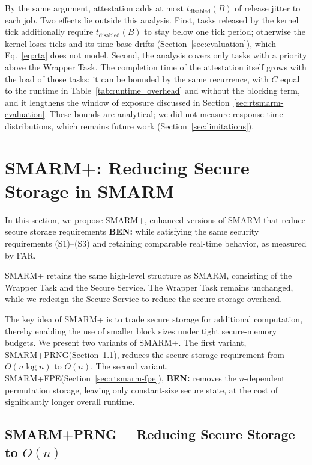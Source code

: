 \documentclass{ieeeaccess}
\DeclareRobustCommand{\ben}[1]{{\color{BENcolor}\textbf{BEN:} #1}}
\newcommand{\rtsmarm}{SMARM+\xspace}
\newcommand{\rtsmarmone}{SMARM+PRNG\xspace}
\newcommand{\rtsmarmtwo}{SMARM+FPE\xspace}
\begin{document}
{By the same argument, attestation adds at most $t_{\text{disabled}}(B)$ of release jitter to each job.
Two effects lie outside this analysis.
First, tasks released by the kernel tick additionally require $t_{\text{disabled}}(B)$ to stay below one tick period; otherwise the kernel loses ticks and its time base drifts (Section~\ref{sec:evaluation}), which Eq.~\eqref{eq:rta} does not model.
Second, the analysis covers only tasks with a priority above the Wrapper Task.
The completion time of the attestation itself grows with the load of those tasks; it can be bounded by the same recurrence, with $C$ equal to the runtime in Table~\ref{tab:runtime_overhead} and without the blocking term, and it lengthens the window of exposure discussed in Section~\ref{sec:rtsmarm-evaluation}.
These bounds are analytical; we did not measure response-time distributions, which remains future work (Section~\ref{sec:limitations}).}



\section{\rtsmarm: Reducing Secure Storage in SMARM}
\label{sec:resmarm-design}


In this section, we propose \rtsmarm, enhanced versions of SMARM that reduce secure storage requirements \ben{while satisfying the same security requirements (S1)--(S3) and retaining comparable real-time behavior, as measured by FAR}.

\rtsmarm retains the same high-level structure as SMARM, consisting of the Wrapper Task and the Secure Service.
The Wrapper Task remains unchanged, while we redesign the Secure Service to reduce the secure storage overhead.

The key idea of \rtsmarm is to trade secure storage for additional computation, thereby enabling the use of smaller block sizes under tight secure-memory budgets.
We present two variants of \rtsmarm.
The first variant, \rtsmarmone (Section~\ref{sec:rtsmarm-bitarray}), reduces the secure storage requirement from $O(n \log n)$ to $O(n)$.
The second variant, \rtsmarmtwo (Section~\ref{sec:rtsmarm-fpe}), \ben{removes the $n$-dependent permutation storage, leaving only constant-size secure state}, at the cost of significantly longer overall runtime.




\subsection{\rtsmarmone\ -- Reducing Secure Storage to $O(n)$}
\label{sec:rtsmarm-bitarray}
\end{document}
